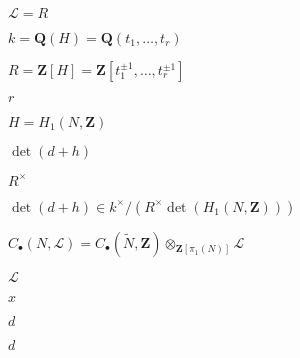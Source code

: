 \begin{preview}
\setcounter{equation}{0}%
\( \mathcal{L} = R \)
\end{preview}

\begin{preview}
\setcounter{equation}{0}%
\( k = \mathbf{Q}(H) = \mathbf{Q}(t_{1} , \ldots , t_{r}) \)
\end{preview}

\begin{preview}
\setcounter{equation}{0}%
\( R = \mathbf{Z}[H] = \mathbf{Z}[ t_1^{\pm 1} , \ldots , t_r^{\pm 1}] \)
\end{preview}

\begin{preview}
\setcounter{equation}{0}%
\( r \)
\end{preview}

\begin{preview}
\setcounter{equation}{0}%
\(H = H_1(N, \mathbf{Z}) \)
\end{preview}

\begin{preview}
\setcounter{equation}{0}%
\( \det (d+h) \)
\end{preview}

\begin{preview}
\setcounter{equation}{0}%
\( R^{\times } \)
\end{preview}

\begin{preview}
\setcounter{equation}{0}%
\( \det (d+h) \in k^{\times } /  (R^{\times } \det(H_1(N , \mathbf{Z}))) \)
\end{preview}

\begin{preview}
\setcounter{equation}{0}%
\(  C_{\bullet} (N , \mathcal{L}) =  C_{\bullet} ( \widetilde{N} , \mathbf{Z}) \otimes _{\mathbf{Z} [ \pi_1(N)]} \mathcal{L} \)
\end{preview}

\begin{preview}
\setcounter{equation}{0}%
\( \mathcal{L} \)
\end{preview}

\begin{preview}
\setcounter{equation}{0}%
\( x \)
\end{preview}

\begin{preview}
\setcounter{equation}{0}%
\( d \)
\end{preview}

\begin{preview}
\setcounter{equation}{0}%
\( d \)
\end{preview}

